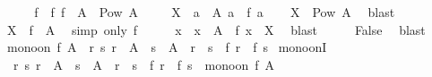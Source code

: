 \begin{isabellebody}
\ \ \isamarkupfalse%
\ \isamarkupfalse%
\ f\ \ f{\isacharcolon}{\kern0pt}\ {\isachardoublequoteopen}f\ {\isacharbackquote}{\kern0pt}\ A\ {\isacharequal}{\kern0pt}\ Pow\ A{\isachardoublequoteclose}\ \isacommand{{\isachardot}{\kern0pt}{\isachardot}{\kern0pt}}\isamarkupfalse%
\isanewline
\ \ \isamarkupfalse%
\ {\isacharquery}{\kern0pt}X\ {\isacharequal}{\kern0pt}\ {\isachardoublequoteopen}{\isacharbraceleft}{\kern0pt}a\ {\isasymin}\ A{\isachardot}{\kern0pt}\ a\ {\isasymnotin}\ f\ a{\isacharbraceright}{\kern0pt}{\isachardoublequoteclose}\isanewline
\ \ \isamarkupfalse%
\ {\isachardoublequoteopen}{\isacharquery}{\kern0pt}X\ {\isasymin}\ Pow\ A{\isachardoublequoteclose}\ \isamarkupfalse%
\ blast\isanewline
\ \ \isamarkupfalse%
\ \isamarkupfalse%
\ {\isachardoublequoteopen}{\isacharquery}{\kern0pt}X\ {\isasymin}\ f\ {\isacharbackquote}{\kern0pt}\ A{\isachardoublequoteclose}\ \isamarkupfalse%
\ {\isacharparenleft}{\kern0pt}simp\ only{\isacharcolon}{\kern0pt}\ f{\isacharparenright}{\kern0pt}\isanewline
\ \ \isamarkupfalse%
\ \isamarkupfalse%
\ x\ \ {\isachardoublequoteopen}x\ {\isasymin}\ A{\isachardoublequoteclose}\ \ {\isachardoublequoteopen}f\ x\ {\isacharequal}{\kern0pt}\ {\isacharquery}{\kern0pt}X{\isachardoublequoteclose}\ \isamarkupfalse%
\ blast\isanewline
\ \ \isamarkupfalse%
\ \isamarkupfalse%
\ False\ \isamarkupfalse%
\ blast\isanewline
{}\isamarkupfalse%
%
\endisatagproof
{\isafoldproof}%
%
\isadelimproof
%
\endisadelimproof
%
\isadelimdocument
%
\endisadelimdocument
%
\isatagdocument
%
\isamarkuptrue%
%
\endisatagdocument
{\isafolddocument}%
%
\isadelimdocument
%
\endisadelimdocument
{}\isamarkupfalse%
\ {\isachardoublequoteopen}mono{\isacharunderscore}{\kern0pt}on\ f\ A\ {\isasymequiv}\ {\isasymforall}r\ s{\isachardot}{\kern0pt}\ r\ {\isasymin}\ A\ {\isasymand}\ s\ {\isasymin}\ A\ {\isasymand}\ r\ {\isasymle}\ s\ {\isasymlongrightarrow}\ f\ r\ {\isasymle}\ f\ s{\isachardoublequoteclose}\isanewline
\isanewline
{}\isamarkupfalse%
\ mono{\isacharunderscore}{\kern0pt}onI{\isacharcolon}{\kern0pt}\isanewline
\ \ {\isachardoublequoteopen}{\isacharparenleft}{\kern0pt}{\isasymAnd}r\ s{\isachardot}{\kern0pt}\ r\ {\isasymin}\ A\ {\isasymLongrightarrow}\ s\ {\isasymin}\ A\ {\isasymLongrightarrow}\ r\ {\isasymle}\ s\ {\isasymLongrightarrow}\ f\ r\ {\isasymle}\ f\ s{\isacharparenright}{\kern0pt}\ {\isasymLongrightarrow}\ mono{\isacharunderscore}{\kern0pt}on\ f\ A{\isachardoublequoteclose}\isanewline

\end{isabellebody}
